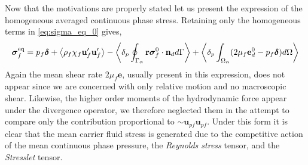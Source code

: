Now that the motivations are properly stated let us present the expression of the homogeneous averaged continuous phase stress. 
Retaining only the homogeneous terms in \ref{eq:sigma_eq_0} gives, 
\begin{equation}
    \bm{\sigma}^\text{eq}_f = 
    p_f \bm\delta 
    +\avg{\rho_f\chi_f\textbf{u}_f'\textbf{u}_f'}
    - \pSavg{\textbf{r}\bm{\sigma}_f^0\cdot \textbf{n}_d}
    +  \pOavg{(2 \mu_f \textbf{e}_d^0 - p_f\bm\delta)}
    \label{eq:sigma_eq_f}
\end{equation} 
Again the mean shear rate $2\mu_f\textbf{e}$, usually present in this expression, does not appear since we are concerned with only relative motion and no macroscopic shear. 
Likewise, the higher order moments of the hydrodynamic force appear under the divergence operator, we therefore neglected them in the attempt to compare only the contribution proportional to $\sim \textbf{u}_{pf}\textbf{u}_{pf}$. 
Under this form it is clear that the mean carrier fluid stress is generated due to the competitive action of the mean continuous phase pressure, the \textit{Reynolds stress} tensor, and the \textit{Stresslet} tensor. 

